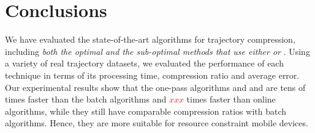 \section{Conclusions}

We have evaluated the state-of-the-art \lsa algorithms for trajectory compression, including \emph{both the optimal and the sub-optimal methods that use either \ped or \sed}. 
Using a variety of real trajectory datasets, we evaluated the performance of each technique in terms of its processing time, compression ratio and average error.
Our experimental results show that the one-pass algorithms \siped and \operb and \cised are tens of times faster than the batch algorithms and \textcolor{red}{$xxx$} times faster than online algorithms, while they still have comparable compression ratios with batch algorithms. 
Hence, they are more suitable for resource constraint mobile devices.